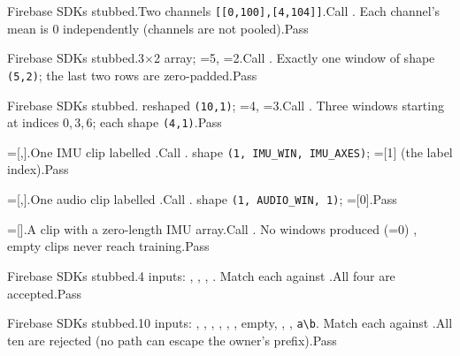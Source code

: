 {Firebase SDKs stubbed.}{Two channels \texttt{[[0,100],[4,104]]}.}{Call .}
{Each channel's mean is 0 independently (channels are not pooled).}{Pass}

{Firebase SDKs stubbed.}{3$\times$2 array; =5, =2.}{Call .}
{Exactly one window of shape \texttt{(5,2)}; the last two rows are zero-padded.}{Pass}

{Firebase SDKs stubbed.}{ reshaped \texttt{(10,1)}; =4, =3.}{Call .}
{Three windows starting at indices 0,\,3,\,6; each shape \texttt{(4,1)}.}{Pass}

{=[,].}{One IMU clip labelled .}{Call .}
{ shape \texttt{(1, IMU\_WIN, IMU\_AXES)}; =[1] (the label index).}{Pass}

{=[,].}{One audio clip labelled .}{Call .}
{ shape \texttt{(1, AUDIO\_WIN, 1)}; =[0].}{Pass}

{=[].}{A clip with a zero-length IMU array.}{Call .}
{No windows produced (=0) , empty clips never reach training.}{Pass}

{Firebase SDKs stubbed.}{4 inputs: , , , .}
{Match each against .}{All four are accepted.}{Pass}

{Firebase SDKs stubbed.}{10 inputs: , , , , , , empty, , , \texttt{a\textbackslash b}.}
{Match each against .}{All ten are rejected (no path can escape the owner's prefix).}{Pass}


